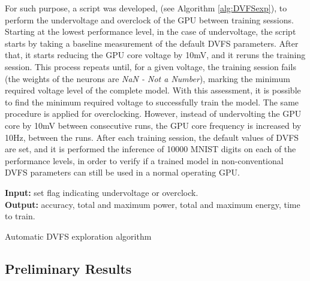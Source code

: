 For such purpose, a script was developed, (see Algorithm \ref{alg:DVFSexp}), to perform the undervoltage and overclock of the GPU between training sessions. Starting at the lowest performance level, in the case of undervoltage, the script starts by taking a baseline measurement of the default DVFS parameters. After that, it starts reducing the GPU core voltage by 10mV, and it reruns the training session. This process repeats until, for a given voltage, the training session fails (the weights of the neurons are \textit{NaN - Not a Number}), marking the minimum required voltage level of the complete model. With this assessment, it is possible to find the minimum required voltage to successfully train the model. The same procedure is applied for overclocking. However, instead of undervolting the GPU core by 10mV between consecutive runs, the GPU core frequency is increased by 10Hz, between the runs. After each training session, the default values of DVFS are set, and it is performed the inference of 10000 MNIST digits on each of the performance levels, in order to verify if a trained model in non-conventional DVFS parameters can still be used in a normal operating GPU.


\begin{algorithm}[!htb]
\label{alg:DVFSexp}
\SetAlgoLined
\textbf{Input:} set flag indicating undervoltage or overclock.\\
\textbf{Output:} accuracy, total and maximum power, total and maximum energy, time to train.\\
 \caption{Automatic DVFS exploration algorithm}
\end{algorithm}


\subsection{Preliminary Results}
\label{section:preliminaryresults}

